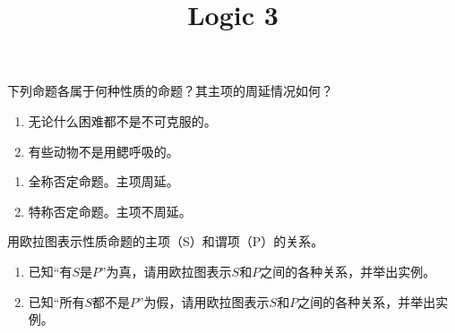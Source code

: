 \documentclass{ctexart}
\newif\ifpreface
\begin{document}
\large
\setlength{\baselineskip}{1.2em}
\ifpreface
  
\else
  \title{Logic 3}
  \maketitle
\fi
\begin{problem}\label{pro:1}
  下列命题各属于何种性质的命题？其主项的周延情况如何？
  \begin{enumerate}
    \item 无论什么困难都不是不可克服的。
    \item 有些动物不是用鳃呼吸的。
  \end{enumerate}
\end{problem}
\begin{solution}
  \begin{enumerate}
    \item 全称否定命题。主项周延。
    \item 特称否定命题。主项不周延。
  \end{enumerate}
\end{solution}
\begin{problem}\label{pro:2}
  用欧拉图表示性质命题的主项（S）和谓项（P）的关系。
  \begin{enumerate}
    \item 已知``有\(S\)是\(P\)''为真，请用欧拉图表示\(S\)和\(P\)之间的各种关系，并举出实例。
    \item 已知``所有\(S\)都不是\(P\)''为假，请用欧拉图表示\(S\)和\(P\)之间的各种关系，并举出实例。
  \end{enumerate}
\end{problem}
\end{document}
